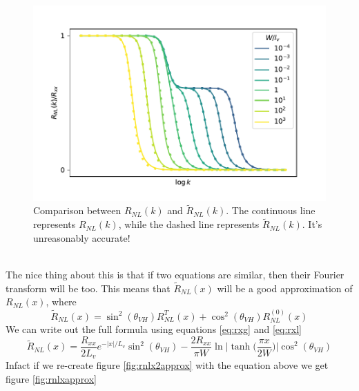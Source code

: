 \begin{figure}[h!]
    \centering
    \includegraphics[width=\linewidth]{Immagini/rnl/kapproxcomp.pdf}
    \caption{Comparison between $R_{NL}(k)$ and $\tilde R_{NL}(k)$. The continuous line represents $R_{NL}(k)$, while the dashed line represents $\tilde R_{NL}(k)$. It's unreasonably accurate!}
    \label{fig:kapproxcomp}
\end{figure}\\
The nice thing about this is that if two equations are similar, then their Fourier transform will be too.
This means that $\tilde R_{NL}(x)$ will be a good approximation of $R_{NL}(x)$, where
\begin{equation}
    \boxed{
        \tilde R_{NL}(x)=
        \sin^2(\theta_{VH})R_{NL}^T(x)+
        \cos^2(\theta_{VH})R_{NL}^{(0)}(x)
    }
\end{equation}
We can write out the full formula using equations \ref{eq:rxg} and \ref{eq:rxl}
\begin{equation}
    \tilde R_{NL}(x)=
    \frac{R_{xx}}{2L_v}e^{-|x|/L_v}\sin^2(\theta_{VH})-
    \frac{2R_{xx}}{\pi W}\ln \bigg|\tanh \Big(\frac{\pi x}{2W}\Big)\bigg|\cos^2(\theta_{VH})
\end{equation}
Infact if we re-create figure \ref{fig:rnlx2approx} with the equation above we get figure \ref{fig:rnlxapprox}
